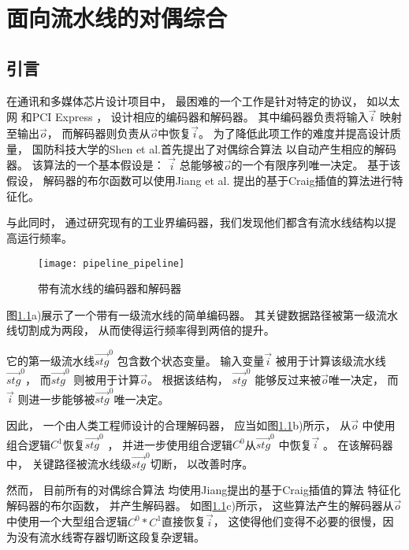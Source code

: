 \chapter{面向流水线的对偶综合}
\label{chap:5}

\section{引言}
在通讯和多媒体芯片设计项目中，
最困难的一个工作是针对特定的协议，
如以太网 和PCI Express ，
设计相应的编码器和解码器。
其中编码器负责将输入$\vec{i}$ 映射至输出$\vec{o}$，
而解码器则负责从$\vec{o}$中恢复$\vec{i}$。
为了降低此项工作的难度并提高设计质量，
国防科技大学的Shen et al.首先提出了对偶综合算法
以自动产生相应的解码器。
该算法的一个基本假设是：
$\vec{i}$ 总能够被$\vec{o}$的一个有限序列唯一决定。
基于该假设，
解码器的布尔函数可以使用Jiang et al. 提出的基于Craig插值的算法进行特征化。

与此同时，
通过研究现有的工业界编码器，我们发现他们都含有流水线结构以提高运行频率。
\begin{figure}[b]
\begin{center}
\texttt{[image: pipeline\_pipeline]}
\end{center}
\caption{带有流水线的编码器和解码器}
  \label{fig_pipe}
\end{figure}

图\ref{fig_pipe}a)展示了一个带有一级流水线的简单编码器。
其关键数据路径被第一级流水线切割成为两段，
从而使得运行频率得到两倍的提升。

它的第一级流水线$\vec{stg}^0$ 包含数个状态变量。
输入变量$\vec{i}$ 被用于计算该级流水线$\vec{stg}^0$，
而$\vec{stg}^0$ 则被用于计算$\vec{o}$。
根据该结构，
$\vec{stg}^0$ 能够反过来被$\vec{o}$唯一决定，
而$\vec{i}$ 则进一步能够被$\vec{stg}^0$唯一决定。

因此，
一个由人类工程师设计的合理解码器，
应当如图\ref{fig_pipe}b)所示，
从$\vec{o}$ 中使用组合逻辑$C^1$恢复$\vec{stg}^0$ ，
并进一步使用组合逻辑$C^0$从$\vec{stg}^0$ 中恢复$\vec{i}$ 。
在该解码器中，
关键路径被流水线级$\vec{stg}^0$切断，
以改善时序。



然而，
目前所有的对偶综合算法
均使用Jiang提出的基于Craig插值的算法 特征化解码器的布尔函数，
并产生解码器。
如图\ref{fig_pipe}c)所示，
这些算法产生的解码器从$\vec{o}$中使用一个大型组合逻辑$C^0*C^1$直接恢复$\vec{i}$，
这使得他们变得不必要的很慢，因为没有流水线寄存器切断这段复杂逻辑。

